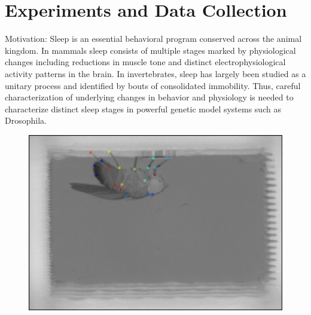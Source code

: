 \chapter{Experiments and Data Collection}\label{chapter:expt-data-collection}
Motivation: Sleep is an essential behavioral program conserved across the animal kingdom.
In mammals sleep consists of multiple stages marked by physiological changes including reductions in muscle tone and distinct electrophysiological activity patterns in the brain.
In invertebrates, sleep has largely been studied as a unitary process and identified by bouts of consolidated immobility.
Thus, careful characterization of underlying changes in behavior and physiology is needed to characterize distinct sleep stages in powerful genetic model systems such as Drosophila.

\begin{figure}[ht!]
	\centering
	\includegraphics[width=0.75\linewidth]{figures/FlyTrackedBodyParts.png}
	\caption{}
\end{figure}

